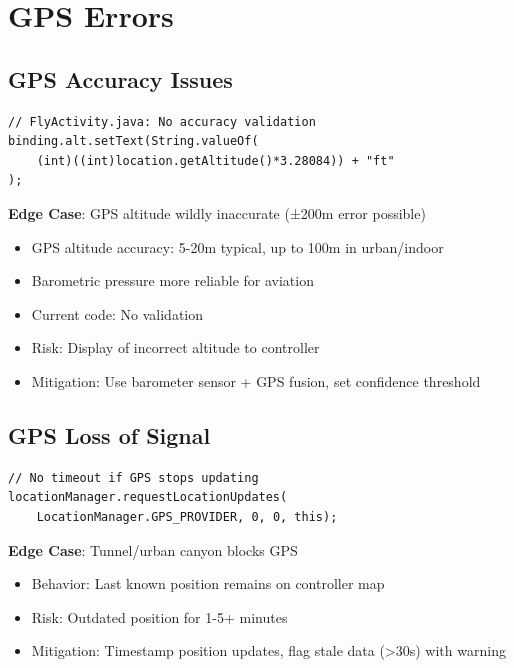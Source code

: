 \documentclass[11pt,a4paper]{report}
\begin{document}
\section{GPS Errors}

\subsection{GPS Accuracy Issues}

\begin{lstlisting}
// FlyActivity.java: No accuracy validation
binding.alt.setText(String.valueOf(
    (int)((int)location.getAltitude()*3.28084)) + "ft"
);
\end{lstlisting}

\textbf{Edge Case}: GPS altitude wildly inaccurate (±200m error possible)

\begin{itemize}
    \item GPS altitude accuracy: 5-20m typical, up to 100m in urban/indoor
    \item Barometric pressure more reliable for aviation
    \item Current code: No validation
    \item Risk: Display of incorrect altitude to controller
    \item Mitigation: Use barometer sensor + GPS fusion, set confidence threshold
\end{itemize}

\subsection{GPS Loss of Signal}

\begin{lstlisting}
// No timeout if GPS stops updating
locationManager.requestLocationUpdates(
    LocationManager.GPS_PROVIDER, 0, 0, this);
\end{lstlisting}

\textbf{Edge Case}: Tunnel/urban canyon blocks GPS

\begin{itemize}
    \item Behavior: Last known position remains on controller map
    \item Risk: Outdated position for 1-5+ minutes
    \item Mitigation: Timestamp position updates, flag stale data (\textgreater 30s) with warning
\end{itemize}
\end{document}
